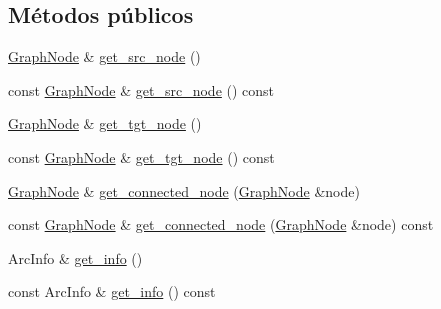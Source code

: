 \subsection*{Métodos públicos}
\begin{DoxyCompactItemize}
\item 
\hyperlink{class_designar_1_1_graph_node}{Graph\+Node} \& \hyperlink{class_designar_1_1_base_graph_arc_ae5bf587f363169ac3cf0de8808410476}{get\+\_\+src\+\_\+node} ()
\item 
const \hyperlink{class_designar_1_1_graph_node}{Graph\+Node} \& \hyperlink{class_designar_1_1_base_graph_arc_abf7c4174301f972969bc11e9154a353a}{get\+\_\+src\+\_\+node} () const
\item 
\hyperlink{class_designar_1_1_graph_node}{Graph\+Node} \& \hyperlink{class_designar_1_1_base_graph_arc_a2fe944d9d98fd2451d0c82fa0e805bce}{get\+\_\+tgt\+\_\+node} ()
\item 
const \hyperlink{class_designar_1_1_graph_node}{Graph\+Node} \& \hyperlink{class_designar_1_1_base_graph_arc_aecf3b0b06c1019563d433d44e922775b}{get\+\_\+tgt\+\_\+node} () const
\item 
\hyperlink{class_designar_1_1_graph_node}{Graph\+Node} \& \hyperlink{class_designar_1_1_base_graph_arc_a756bd68ff9797ff54b53657c2a39730c}{get\+\_\+connected\+\_\+node} (\hyperlink{class_designar_1_1_graph_node}{Graph\+Node} \&node)
\item 
const \hyperlink{class_designar_1_1_graph_node}{Graph\+Node} \& \hyperlink{class_designar_1_1_base_graph_arc_a5e8a913b9632b653908d054a7e277d7a}{get\+\_\+connected\+\_\+node} (\hyperlink{class_designar_1_1_graph_node}{Graph\+Node} \&node) const
\item 
Arc\+Info \& \hyperlink{class_designar_1_1_base_graph_arc_a90c613c982dec0d38acd6051c26a5562}{get\+\_\+info} ()
\item 
const Arc\+Info \& \hyperlink{class_designar_1_1_base_graph_arc_a90dce6365bbeef65a6ff5fa343b27710}{get\+\_\+info} () const
\end{DoxyCompactItemize}
